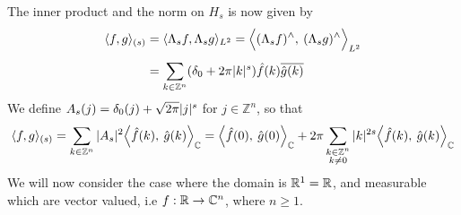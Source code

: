 \documentclass[../main-v2-manifolds.tex]{subfiles}
\begin{document}
The inner product and the norm on $H_s$ is now given by
\begin{align}
\langle f,g\rangle_{(s)} &= \langle \Lambda_s f,\Lambda_s g\rangle_{L^2} =\Big\langle {(\Lambda_s f)^{\wedge}},\: {(\Lambda_s g)^{\wedge}} \Big\rangle_{L^2}\nonumber\\[1ex]
&= \sum_{k\in\mathbb{Z}^n}(\delta_0 + 2\pi \vert {k} \vert^s)\hat{f}(k)\overline{\hat{g}(k)}\label{eq:hofer 1/2 inner product}
\end{align}
We define $A_s(j) = \delta_0(j) + \sqrt{2\pi}\vert {j} \vert^s$ for $j\in\mathbb{Z}^n$, so that
\begin{equation}
\langle f,g \rangle_{(s)} = \sum_{k\in\mathbb{Z}^n} \vert {A_s} \vert^2 \Big\langle {\hat{f}(k)},\: {\hat{g}(k)} \Big\rangle_{\mathbb{C}}= \Big\langle {\hat{f}(0)},\: {\hat{g}(0)} \Big\rangle_{\mathbb{C}} + 2\pi\sum_{\substack{k\in\mathbb{Z}^n\\k\neq 0}}\vert {k} \vert^{2s}\Big\langle {\hat{f}(k)},\: {\hat{g}(k)} \Big\rangle_{\mathbb{C}}\label{eq:hofer 1/2 norm}
\end{equation}
We will now consider the case where the domain is $\mathbb{R}^1 = \mathbb{R}$, and measurable which are vector valued, i.e $f: \mathbb{R}\to \mathbb{C}^n$, where $n\geq 1$.\\
\end{document}
